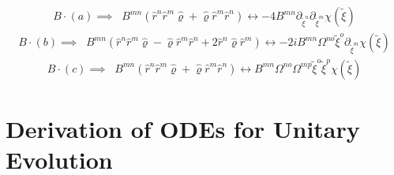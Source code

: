 \documentclass[%
reprint,
superscriptaddress,
nofootinbib,
 amsmath,amssymb,
prx,
floatfix,
]{revtex4-2}
\begin{document}
\begin{align}
\label{eq:anti_phase_master}
     B \cdot (a) \implies \;\; B^{mn} \left( \hat{r}^n  \hat{r}^m  \hat{\varrho} + \hat{\varrho} \hat{r}^m  \hat{r}^n  \right) \longleftrightarrow   - 4 B^{mn} \partial_{\tilde{\xi}^n} \partial_{\tilde{\xi}^m} \chi (\tilde{\xi}) 
\end{align}
\begin{align}
\label{eq:antsim_phase_master}
      B \cdot (b) \implies \;\;  B^{mn} \left( \hat{r}^n  \hat{r}^m  \hat{\varrho} - \hat{\varrho} \hat{r}^m  \hat{r}^n  + 2 \hat{r}^n  \hat{\varrho}  \hat{r}^m \right) \longleftrightarrow   - 2 i  B^{mn} \Omega^{n o} \tilde{\xi}^o  \partial_{\tilde{\xi}^m} \chi (\tilde{\xi}) 
\end{align}
\begin{align*}
       B \cdot (c) \implies \;\;  B^{mn} \left( \hat{r}^n  \hat{r}^m  \hat{\varrho} + \hat{\varrho} \hat{r}^m  \hat{r}^n  \right)  \longleftrightarrow B^{mn} \Omega^{n o} \Omega^{m p} \tilde{\xi}^o \tilde{\xi}^p \chi (\tilde{\xi}) 
\end{align*}


\section{Derivation of ODEs for Unitary Evolution \label{app:unitary_general}}
\end{document}

